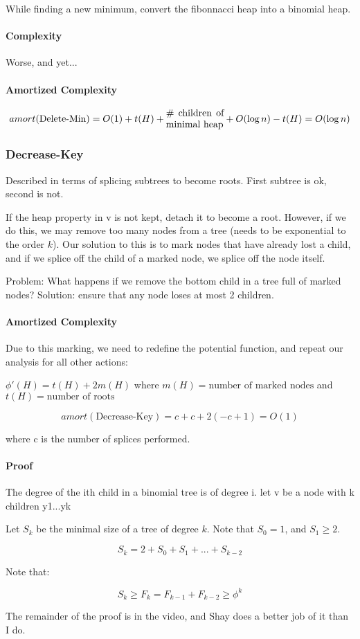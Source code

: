 \documentclass[a4paper]{article}
\begin{document}
While finding a new minimum, convert the fibonnacci heap into a binomial heap.

\paragraph{Complexity}
Worse, and yet...

\paragraph{Amortized Complexity}
\[amort(\text{Delete-Min})=O(1)+t(H)+\parbox{6em}{\# children of minimal heap}+O(\log n)-t(H)=O(\log n)\]

\subsubsection{Decrease-Key}
Described in terms of splicing subtrees to become roots. First subtree is ok, second is not.

If the heap property in v is not kept, detach it to become a root. However, if we do this, we may remove too many nodes from a tree (needs to be exponential to the order $k$). Our solution to this is to mark nodes that have already lost a child, and if we splice off the child of a marked node, we splice off the node itself.

Problem: What happens if we remove the bottom child in a tree full of marked nodes?
Solution: ensure that any node loses at most 2 children.

\paragraph{Amortized Complexity}
Due to this marking, we need to redefine the potential function, and repeat our analysis for all other actions:

$\phi'(H)=t(H)+2m(H)$ where $m(H)=\text{number of marked nodes}$ and $t(H)=\text{number of roots}$

\[amort(\text{Decrease-Key})=c+c+2(-c+1)=O(1)\]

where c is the number of splices performed.

\paragraph{Proof}
The degree of the ith child in a binomial tree is of degree i.
let v be a node with k children
y1...yk

Let $S_k$ be the minimal size of a tree of degree $k$. Note that $S_0=1$, and $S_1\ge2$.

\[S_k=2+S_0+S_1+...+S_{k-2}\]

Note that:

\[S_k \ge F_k=F_{k-1}+F_{k-2} \ge \phi^k \]

The remainder of the proof is in the video, and Shay does a better job of it than I do.
\end{document}
